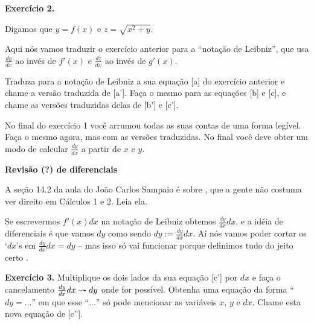 \documentclass[oneside,12pt]{article}
\begin{document}

{\bf Exercício 2.}

\ssk

Digamos que $y=f(x)$ e $z=\sqrt{x^2 + y}$.

Aqui nós vamos traduzir o exercício anterior para a ``notação de
Leibniz'', que usa $\frac{dy}{dx}$ ao invés de $f'(x)$ e
$\frac{dz}{dx}$ ao invés de $g'(x)$.

Traduza para a notação de Leibniz a sua equação [a] do exercício
anterior e chame a versão traduzida de [a']. Faça o mesmo para as
equações [b] e [c], e chame as versões traduzidas delas de [b'] e [c'].

No final do exercício 1 você arrumou todas as suas contas de uma forma
legível. Faça o mesmo agora, mas com as versões traduzidas. No final
você deve obter um modo de calcular $\frac{dy}{dx}$ a partir de $x$ e
$y$.


\newpage


{\bf Revisão (?) de diferenciais}

\ssk

A seção 14.2 da aula do João Carlos Sampaio é sobre
, que a gente não costuma ver direito em
Cálculos 1 e 2. Leia ela.

\msk

Se escrevermos $f'(x)dx$ na notação de Leibniz obtemos
$\frac{dy}{dx}dx$, e a idéia de diferenciais é que vamos
 $dy$ como sendo $dy := \frac{dy}{dx}dx$. Aí nós
vamos poder cortar os `$dx$'s em $\frac{dy}{dx}dx = dy$ -- mas isso só
vai funcionar porque definimos tudo do jeito certo .

\msk

{\bf Exercício 3.} Multiplique os dois lados da sua equação [c'] por
$dx$ e faça o cancelamento $\frac{dy}{dx}dx \rightsquigarrow dy$ onde for
possível. Obtenha uma equação da forma ``$dy = \ldots$'' em que esse
``$\ldots$'' só pode mencionar as variáveis $x$, $y$ e $dx$. Chame
esta nova equação de [c''].



\newpage

\end{document}
